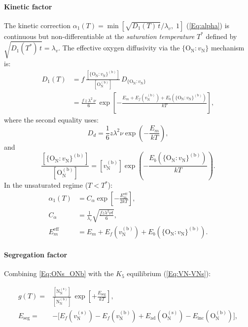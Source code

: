 \documentclass[preprint,12pt,sort&compress]{elsarticle}
\newcommand{\?}{\stackrel{?}{=}}
\begin{document}
\paragraph{Kinetic factor} The kinetic correction $\alpha_1(T) = \min[\sqrt{D_1(T)\,t}/\lambda_v,\; 1]$ (\cref{Eq:alpha}) is continuous but non-differentiable at the \emph{saturation temperature} $T^*$ defined by $\sqrt{D_1(T^*)\,t} = \lambda_v$. The effective oxygen diffusivity via the $\{\text{O}_\text{N} : v_\text{N}\}$ mechanism is:
\begin{align}
D_1(T) & = f\,\frac{[\{\text{O}_\text{N}:v_\text{N}\}^{(\text{b})}]}{[\text{O}_\text{N}^{(\text{b})}]}\,D_{\{\text{O}_\text{N}:v_\text{N}\}} \\
& = \frac{f\,z\,\lambda^2\,\nu}{6}\,\exp\!\left[-\frac{E_m + E_f(v_\text{N}^{(\text{b})}) + E_b(\{\text{O}_\text{N}:v_\text{N}\}^{(\text{b})})}{kT}\right],
\label{Eq:App:D1}
\end{align}
where the second equality uses:
\begin{equation}
D_d = \frac{1}{6}z\lambda^2\nu\exp\left( - \frac{E_m}{kT} \right), 
\end{equation}
and
\begin{equation}
\frac {[\{\text{O}_\text{N}:v_\text{N}\}^{(\text{b})}]}  {[\text{O}_\text{N}^{(\text{b})}]} = [v_\text{N}^{(\text{b})}] \exp\left( - \frac{E_b(\{\text{O}_\text{N}:v_\text{N}\}^{(\text{b})})} {kT} \right).
\end{equation}
In the unsaturated regime ($T < T^*$):
\begin{align}
\alpha_1(T)
&=
C_\alpha
\exp\!\left[
-\frac{E_m^\mathrm{eff}}{2kT}
\right],
\label{Eq:App:alpha1Unsat}
\\
C_\alpha
&=
\frac{1}{\lambda_v}
\sqrt{
\frac{
f z \lambda^2 \nu t
}{6}
},
\label{Eq:App:CAlpha}
\\
E_m^\mathrm{eff}
&=
E_m
+
E_f(v_\text{N}^{(\text{b})})
+
E_b(\{\text{O}_\text{N}:v_\text{N}\}^{(\text{b})}).
\label{Eq:App:EmEff}
\end{align}

\paragraph{Segregation factor} Combining \cref{Eq:ONs_ONb} with the $K_5$ equilibrium (\cref{Eq:VN-VNs}):

\begin{align}
g(T) = & \frac{[\text{N}_\text{N}^{(\text{s})}]}{[\text{N}_\text{N}^{(\text{b})}]}\,\exp\!\left[+\frac{E_\text{seg}}{kT}\right], \\
E_\text{seg} = & -\bigl[E_f(v_\text{N}^{(\text{s})}) - E_f(v_\text{N}^{(\text{b})}) + E_\text{ad}(\text{O}_\text{N}^{(\text{s})}) - E_\text{inc}(\text{O}_\text{N}^{(\text{b})})\bigr],
\label{Eq:App:gT}
\end{align}
\end{document}
